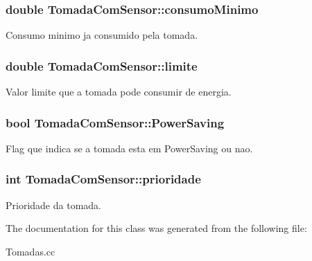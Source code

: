\subsubsection[{\texorpdfstring{consumo\+Minimo}{consumoMinimo}}]{\setlength{\rightskip}{0pt plus 5cm}double Tomada\+Com\+Sensor\+::consumo\+Minimo\hspace{0.3cm}{\ttfamily [protected]}}\hypertarget{class_tomada_com_sensor_a7cc1313f4b832ff86c0a2e64075ff1fb}{}\label{class_tomada_com_sensor_a7cc1313f4b832ff86c0a2e64075ff1fb}
Consumo minimo ja consumido pela tomada. 
\subsubsection[{\texorpdfstring{limite}{limite}}]{\setlength{\rightskip}{0pt plus 5cm}double Tomada\+Com\+Sensor\+::limite\hspace{0.3cm}{\ttfamily [protected]}}\hypertarget{class_tomada_com_sensor_a4fa168e84ddba87d544002931e555c1c}{}\label{class_tomada_com_sensor_a4fa168e84ddba87d544002931e555c1c}
Valor limite que a tomada pode consumir de energia. 
\subsubsection[{\texorpdfstring{Power\+Saving}{PowerSaving}}]{\setlength{\rightskip}{0pt plus 5cm}bool Tomada\+Com\+Sensor\+::\+Power\+Saving\hspace{0.3cm}{\ttfamily [protected]}}\hypertarget{class_tomada_com_sensor_a7028d0e9bff4c0986666786b61d75941}{}\label{class_tomada_com_sensor_a7028d0e9bff4c0986666786b61d75941}
Flag que indica se a tomada esta em Power\+Saving ou nao. 
\subsubsection[{\texorpdfstring{prioridade}{prioridade}}]{\setlength{\rightskip}{0pt plus 5cm}int Tomada\+Com\+Sensor\+::prioridade\hspace{0.3cm}{\ttfamily [protected]}}\hypertarget{class_tomada_com_sensor_ae1a501c37fc9c15a349037e864b01799}{}\label{class_tomada_com_sensor_ae1a501c37fc9c15a349037e864b01799}
Prioridade da tomada. 

The documentation for this class was generated from the following file\+:\begin{DoxyCompactItemize}
\item 
Tomadas.\+cc\end{DoxyCompactItemize}
